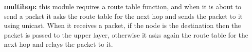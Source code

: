 \textbf{multihop:} this module requires a route table function,
	and when it is about to send a packet it asks the route table for the next hop and sends the packet to it using unicast.
When it receives a packet,
	if the node is the destination then the packet is passed to the upper layer,
	otherwise it asks again the route table for the next hop and relays the packet to it.
































